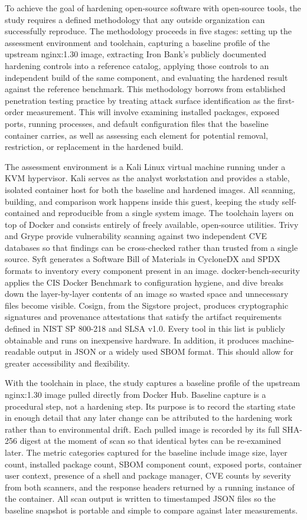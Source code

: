 \documentclass[10pt,letterpaper,twocolumn]{article}
\begin{document}
To achieve the goal of hardening open-source software with open-source tools, the study requires a defined methodology that any outside organization can successfully reproduce. The methodology proceeds in five stages: setting up the assessment environment and toolchain, capturing a baseline profile of the upstream nginx:1.30 image, extracting Iron Bank's publicly documented hardening controls into a reference catalog, applying those controls to an independent build of the same component, and evaluating the hardened result against the reference benchmark. This methodology borrows from established penetration testing practice by treating attack surface identification as the first-order measurement. This will involve examining installed packages, exposed ports, running processes, and default configuration files that the baseline container carries, as well as assessing each element for potential removal, restriction, or replacement in the hardened build.

The assessment environment is a Kali Linux virtual machine running under a KVM hypervisor. Kali serves as the analyst workstation and provides a stable, isolated container host for both the baseline and hardened images. All scanning, building, and comparison work happens inside this guest, keeping the study self-contained and reproducible from a single system image. The toolchain layers on top of Docker and consists entirely of freely available, open-source utilities. Trivy and Grype provide vulnerability scanning against two independent CVE databases so that findings can be cross-checked rather than trusted from a single source. Syft generates a Software Bill of Materials in CycloneDX and SPDX formats to inventory every component present in an image. docker-bench-security applies the CIS Docker Benchmark to configuration hygiene, and dive breaks down the layer-by-layer contents of an image so wasted space and unnecessary files become visible. Cosign, from the Sigstore project, produces cryptographic signatures and provenance attestations that satisfy the artifact requirements defined in NIST SP 800-218 and SLSA v1.0. Every tool in this list is publicly obtainable and runs on inexpensive hardware. In addition, it produces machine-readable output in JSON or a widely used SBOM format. This should allow for greater accessibility and flexibility.

With the toolchain in place, the study captures a baseline profile of the upstream nginx:1.30 image pulled directly from Docker Hub. Baseline capture is a procedural step, not a hardening step. Its purpose is to record the starting state in enough detail that any later change can be attributed to the hardening work rather than to environmental drift. Each pulled image is recorded by its full SHA-256 digest at the moment of scan so that identical bytes can be re-examined later. The metric categories captured for the baseline include image size, layer count, installed package count, SBOM component count, exposed ports, container user context, presence of a shell and package manager, CVE counts by severity from both scanners, and the response headers returned by a running instance of the container. All scan output is written to timestamped JSON files so the baseline snapshot is portable and simple to compare against later measurements.
\end{document}
